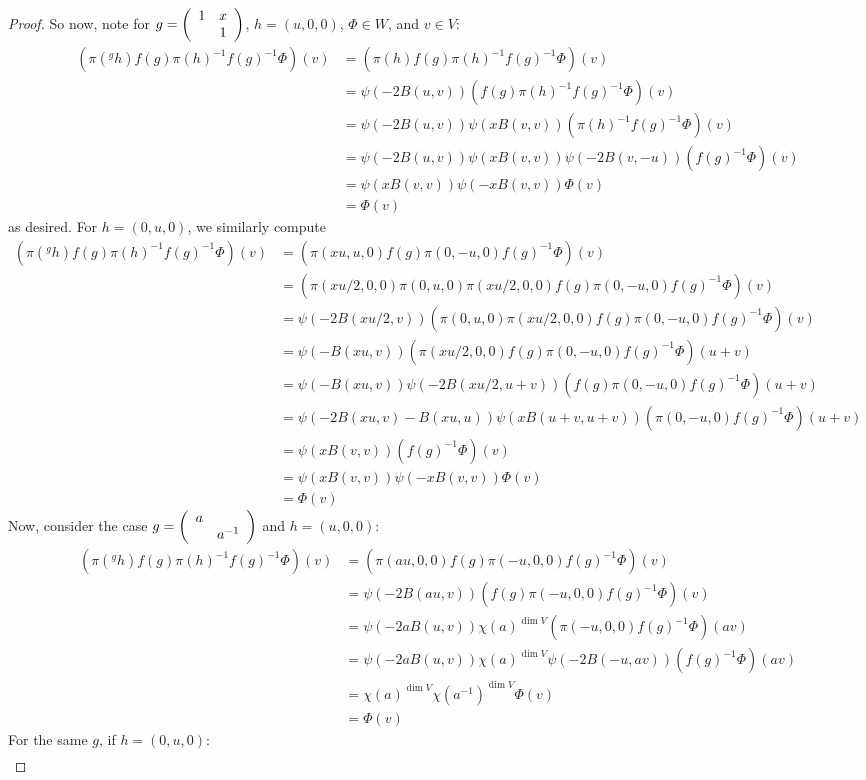 \begin{proof}
	So now, note for $g = \left(\begin{array}{cc} 1 & x \\  & 1 \end{array}\right)$, $h = (u,0,0)$, $\Phi \in W$, and $v \in V$:
	\begin{align*}
	(\pi(^gh)f(g)\pi(h)^{-1}f(g)^{-1}\Phi)(v)
		&= (\pi(h)f(g)\pi(h)^{-1}f(g)^{-1}\Phi)(v) \\
		&= \psi(-2B(u,v))(f(g)\pi(h)^{-1}f(g)^{-1}\Phi)(v) \\
		&= \psi(-2B(u,v))\psi(xB(v,v))(\pi(h)^{-1}f(g)^{-1}\Phi)(v) \\
		&= \psi(-2B(u,v))\psi(xB(v,v))\psi(-2B(v,-u))(f(g)^{-1}\Phi)(v) \\
		&= \psi(xB(v,v))\psi(-xB(v,v))\Phi(v) \\
		&= \Phi(v)
	\end{align*}
	as desired. For $h = (0,u,0)$, we similarly compute
	\begin{align*}
	(\pi(^gh)f(g)\pi(h)^{-1}f(g)^{-1}\Phi)(v)
		&= (\pi(xu,u,0)f(g)\pi(0,-u,0)f(g)^{-1}\Phi)(v) \\
		&= (\pi(xu/2,0,0)\pi(0,u,0)\pi(xu/2,0,0)f(g)\pi(0,-u,0)f(g)^{-1}\Phi)(v) \\
		&= \psi(-2B(xu/2,v))(\pi(0,u,0)\pi(xu/2,0,0)f(g)\pi(0,-u,0)f(g)^{-1}\Phi)(v) \\
		&= \psi(-B(xu,v))(\pi(xu/2,0,0)f(g)\pi(0,-u,0)f(g)^{-1}\Phi)(u+v) \\
		&= \psi(-B(xu,v))\psi(-2B(xu/2,u+v))(f(g)\pi(0,-u,0)f(g)^{-1}\Phi)(u+v) \\
		&= \psi(-2B(xu,v)-B(xu,u))\psi(xB(u+v,u+v))(\pi(0,-u,0)f(g)^{-1}\Phi)(u+v) \\
		&= \psi(xB(v,v))(f(g)^{-1}\Phi)(v) \\
		&= \psi(xB(v,v))\psi(-xB(v,v))\Phi(v) \\
		&= \Phi(v)
	\end{align*}
	Now, consider the case $g = \left(\begin{array}{cc} a &  \\  & a^{-1} \end{array}\right)$ and $h = (u,0,0)$:
	\begin{align*}
	(\pi(^gh)f(g)\pi(h)^{-1}f(g)^{-1}\Phi)(v)
		&= (\pi(au,0,0)f(g)\pi(-u,0,0)f(g)^{-1}\Phi)(v) \\
		&= \psi(-2B(au,v))(f(g)\pi(-u,0,0)f(g)^{-1}\Phi)(v) \\
		&= \psi(-2aB(u,v))\chi(a)^{\dim V}(\pi(-u,0,0)f(g)^{-1}\Phi)(av) \\
		&= \psi(-2aB(u,v))\chi(a)^{\dim V}\psi(-2B(-u,av))(f(g)^{-1}\Phi)(av) \\
		&= \chi(a)^{\dim V}\chi(a^{-1})^{\dim V}\Phi(v) \\
		&= \Phi(v)
	\end{align*}
	For the same $g$, if $h = (0,u,0)$:
	\begin{align*}

\end{align*}
\end{proof}
